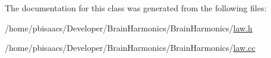 The documentation for this class was generated from the following files\+:\begin{DoxyCompactItemize}
\item 
/home/pbisaacs/\+Developer/\+Brain\+Harmonics/\+Brain\+Harmonics/\mbox{\hyperlink{law_8h}{law.\+h}}\item 
/home/pbisaacs/\+Developer/\+Brain\+Harmonics/\+Brain\+Harmonics/\mbox{\hyperlink{law_8cc}{law.\+cc}}\end{DoxyCompactItemize}
